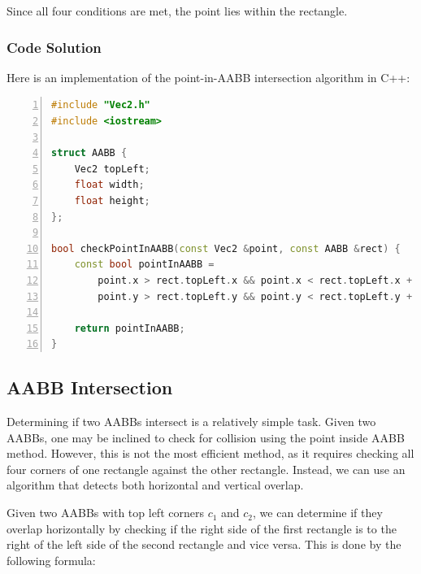 Since all four conditions are met, the point lies within the rectangle.

\subsubsection{Code Solution}

Here is an implementation of the point-in-AABB intersection algorithm in C++:

\begin{mdframed}[linecolor=black!30!white,linewidth=.5pt,extratopheight=1em]
    \begin{lstlisting}[language=C++, aboveskip=3mm,
        belowskip=3mm,
        showstringspaces=false,
        columns=flexible,
        basicstyle={\small\ttfamily},
        numbers=left,
        numberstyle=\tiny\color{gray},
        keywordstyle=\color{blue},
        commentstyle=\color{dkgreen},
        stringstyle=\color{mauve},
        breaklines=true,
        breakatwhitespace=true,
        tabsize=3,
        xleftmargin=1em]
#include "Vec2.h"
#include <iostream>

struct AABB {
    Vec2 topLeft;
    float width;
    float height;
};

bool checkPointInAABB(const Vec2 &point, const AABB &rect) {
    const bool pointInAABB = 
        point.x > rect.topLeft.x && point.x < rect.topLeft.x + rect.width &&
        point.y > rect.topLeft.y && point.y < rect.topLeft.y + rect.height;

    return pointInAABB;
}

\end{lstlisting}
\end{mdframed}

\subsection{AABB Intersection}

Determining if two AABBs intersect is a relatively simple task. Given two
AABBs, one may be inclined to check for collision using the point inside AABB
method. However, this is not the most efficient method, as it requires checking
all four corners of one rectangle against the other rectangle. Instead, we can
use an algorithm that detects both horizontal and vertical overlap.

Given two AABBs with top left corners $c_1$ and $c_2$, we can determine if they
overlap horizontally by checking if the right side of the first rectangle is to
the right of the left side of the second rectangle and vice versa. This is done
by the following formula:

